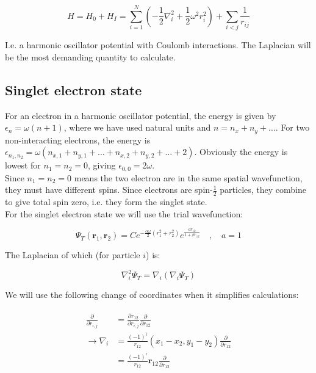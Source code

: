 \documentclass[english, a4paper]{article}
\newcommand{\bm}[1]{\mathbf{#1}}
\begin{document}
	\begin{equation}
	H = H_0 + H_I = \sum_{i=1}^{N}\left(-\frac{1}{2}\nabla_i^2 + \frac{1}{2}\omega^2r_i^2\right) + \sum_{i<j}\frac{1}{r_{ij}}
	\end{equation}
	
	I.e. a harmonic oscillator potential with Coulomb interactions. The Laplacian will be the most demanding quantity to calculate.
	
	\subsection{Singlet electron state}
	For an electron in a harmonic oscillator potential, the energy is given by $\epsilon_n = \omega(n + 1)$, where we have used natural units and $n = n_x + n_y + \ldots$. For two non-interacting electrons, the energy is $\epsilon_{n_1,n_2} = \omega(n_{x,1} + n_{y,1} + \ldots + n_{x,2} + n_{y,2} + \ldots + 2)$. Obviously the energy is lowest for $n_1 = n_2 = 0$, giving $\epsilon_{0,0} = 2\omega$.\\
	Since $n_1=n_2 = 0$ means the two electron are in the same spatial wavefunction, they must have different spins. 
	Since electrons are spin-$\frac{1}{2}$ particles, they combine to give total spin zero, i.e. they form the singlet state.\\
	
	For the singlet electron state we will use the trial wavefunction:
	
	\begin{equation}
	\Psi_T(\bm{r}_1,\bm{r}_2) = Ce^{-\frac{\alpha\omega}{2}(r_1^2+r_2^2)}e^{\frac{ar_{12}}{1+\beta r_{12}}}\quad,\quad a=1 \label{TwoBodyTrailWavefunction}
	\end{equation}
	
	The Laplacian of which (for particle $i$) is:
	
	\begin{equation}
	\nabla_i^2 \Psi_T = \nabla_i(\nabla_i\Psi_T)
	\end{equation}
	
	We will use the following change of coordinates when it simplifies calculations:
	
	\begin{align}
	\begin{split}
	\frac{\partial}{\partial r_{i,j}} &= \frac{\partial r_{12}}{\partial r_{i,j}}\frac{\partial}{\partial r_{12}}\\
	\rightarrow \nabla_i &= \frac{(-1)^i}{r_{12}}(x_1-x_2, y_1-y_2)\frac{\partial}{\partial r_{12}}\\
	&= \frac{(-1)^i}{r_{12}}\bm{r}_{12}\frac{\partial}{\partial r_{12}}
	\end{split}
	\label{eq:coord_change_nabla}
	\end{align}
	
\end{document}
